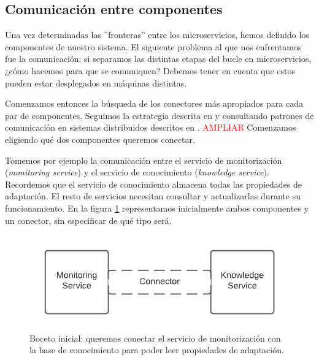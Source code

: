 \subsection{Comunicación entre componentes}

Una vez determinadas las ''fronteras'' entre los microservicios, hemos definido los componentes de nuestro sistema. El siguiente problema al que nos enfrentamos fue la comunicación: si separamos las distintas etapas del bucle en microservicios, ¿cómo hacemos para que se comuniquen? Debemos tener en cuenta que estos pueden estar desplegados en máquinas distintas.

Comenzamos entonces la búsqueda de los conectores más apropiados para cada par de componentes. Seguimos la estrategia descrita en \cite{taylorSoftwareArchitectureFoundations2009} y consultando patrones de comunicación en sistemas distribuidos descritos en \cite{newmanBuildingMicroservicesDesigning2021}. \textcolor{red}{AMPLIAR} Comenzamos eligiendo qué dos componentes queremos conectar.

Tomemos por ejemplo la comunicación entre el servicio de monitorización (\textit{monitoring service}) y el servicio de conocimiento (\textit{knowledge service}). Recordemos que el servicio de conocimiento almacena todas las propiedades de adaptación. El resto de servicios necesitan consultar y actualizarlas durante su funcionamiento. En la figura \ref{fig:monitor-knowledge-initial} representamos inicialmente ambos componentes y un conector, sin especificar de qué tipo será.

\begin{figure}[htb]
  \centering
  \includegraphics{02_arquitectura/images/Monitor-Knowledge-Initial-Connector}
  \caption{Boceto inicial: queremos conectar el servicio de monitorización con la base de conocimiento para poder leer propiedades de adaptación.}
  \label{fig:monitor-knowledge-initial}
\end{figure}

